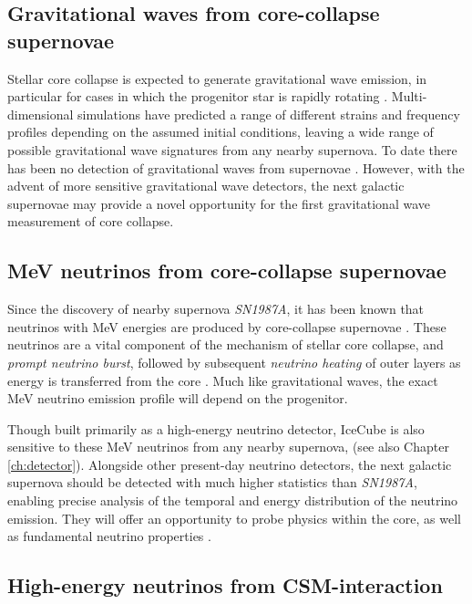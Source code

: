 \subsection*{Gravitational waves from core-collapse supernovae}

Stellar core collapse is expected to generate gravitational wave emission, in particular for cases in which the  progenitor star is rapidly rotating . Multi-dimensional simulations have predicted a range of different strains and frequency profiles depending on the assumed initial conditions, leaving a wide range of possible gravitational wave signatures from any nearby supernova. To date there has been no detection of gravitational waves from supernovae . However, with the advent of more sensitive gravitational wave detectors, the next galactic supernovae may provide a novel opportunity for the first gravitational wave measurement of core collapse.

\subsection*{MeV neutrinos from core-collapse supernovae}

Since the discovery of nearby supernova \emph{SN1987A}, it has been known that neutrinos with MeV energies are produced by core-collapse supernovae . These neutrinos are a vital component of the mechanism of stellar core collapse, and \emph{prompt neutrino burst}, followed by subsequent \emph{neutrino heating} of outer layers as energy is transferred from the core . Much like gravitational waves, the exact MeV neutrino emission profile will depend on the progenitor.

Though built primarily as a high-energy neutrino detector, IceCube is also sensitive to these MeV neutrinos from any nearby supernova, (see also Chapter \ref{ch:detector}). Alongside other present-day neutrino detectors, the next galactic supernova should be detected with much higher statistics than \emph{SN1987A}, enabling precise analysis of the temporal and energy distribution of the neutrino emission. They will offer an opportunity to probe physics within the core, as well as fundamental neutrino properties \cite{sn_nu_review}.

\subsection*{High-energy neutrinos from CSM-interaction}

